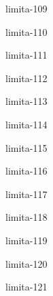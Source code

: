 \begin{defproblem}{limita-109}

\end{defproblem}

\begin{defproblem}{limita-110}

\end{defproblem}

\begin{defproblem}{limita-111}

\end{defproblem}

\begin{defproblem}{limita-112}

\end{defproblem}

\begin{defproblem}{limita-113}

\end{defproblem}

\begin{defproblem}{limita-114}

\end{defproblem}

\begin{defproblem}{limita-115}

\end{defproblem}

\begin{defproblem}{limita-116}

\end{defproblem}

\begin{defproblem}{limita-117}

\end{defproblem}

\begin{defproblem}{limita-118}

\end{defproblem}

\begin{defproblem}{limita-119}

\end{defproblem}

\begin{defproblem}{limita-120}

\end{defproblem}

\begin{defproblem}{limita-121}

\end{defproblem}

